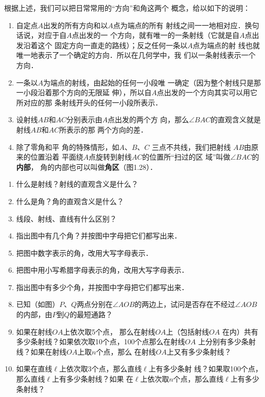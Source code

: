 根据上述，我们可以把日常常用的“方向”和角这两个
概念，给以如下的说明：
\begin{enumerate}
\item 自定点$A$出发的所有方向和以$A$点为端点的所有
射线之间一一地相对应．换句话说，对应于自$A$点出发的一
个方向，就有唯一的一条射线（它就是自$A$点出发沿着这个
固定方向一直走的路线）；反之任何一条以$A$点为端点的射
线也就唯一地表示了一个确定的方向．所以在几何学中，我
们以一条射线表示一个方向．
\item 一条以$A$为端点的射线，由起始的任何一小段唯
一确定（因为整个射线只是那一小段沿着那个方向的无限延
伸），所以自$A$点出发的一个方向其实可以用它所对应的那
条射线开头的任何一小段所表示．
\item 设射线$AB$和$AC$分别表示由$A$点出发的两个方
向，那么$\angle BAC$的直观含义就是射线$AB$和$AC$所表示的那
两个方向的差．
\item 除了零角和平
角的特殊情形，如$A$、$B$、$C$
三点不共线，我们把射线
$AB$由原来的位置沿着
平面绕$A$点旋转到射线$AC$的位置所“扫过的区
域”叫做$\angle BAC$的\textbf{内部}，
角的内部也可以叫做\textbf{角区}（图1.28）．
\end{enumerate}

\begin{ex}
\begin{enumerate}
	\item 什么是射线？射线的直观含义是什么？
	\item 什么是角？角的直观含义是什么？
	\item 线段、射线、直线有什么区别？
	\item 指出图中有几个角？并按图中字母把它们都写出来．
	\item 把图中数字表示的角，改用大写字母表示．
	\item 把图中用小写希腊字母表示的角，改用大写字母表示．
	\item 指出图中有多少个角，并按图中字母把它们都写出来．
	\item 已知（如图）$P$、$Q$两点分别在$\angle AOB$的两边上，试问是否存在不经过$\angle AOB$的内部，由$	P$到$Q$的最短通路？
	\item 如果在射线$OA$上依次取5个点，
	那么在射线$OA$上（包括射线$OA$
	在内）共有多少条射线？如果依次取10个点，100个点那么在射线$OA$
	上分别有多少条射线？如果在射线$OA$上取$n$个点，那么
在射线$OA$上又有多少条射线？
\item 如果在直线$\ell$上依次取3个点，那么直线$\ell$上有多少条射
线？如果取100个点，那么直线$\ell$上有多少条射线？如果
在$\ell$上依次取$n$个点，那么直线$\ell$上有多少条射线？
\end{enumerate}
\end{ex}


